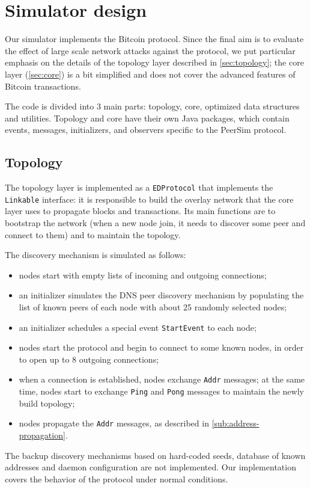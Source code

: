 \section{Simulator design}
Our simulator implements the Bitcoin protocol.
Since the final aim is to evaluate the effect of large scale network attacks against the protocol, we put particular emphasis on the details of the topology layer described in \cref{sec:topology};
the core layer (\cref{sec:core}) is a bit simplified and does not cover the advanced features of Bitcoin transactions.

\smallskip
The code is divided into \num{3} main parts: topology, core, optimized data structures and utilities.
Topology and core have their own Java packages, which contain events, messages, initializers, and observers specific to the PeerSim protocol.

\subsection{Topology}
The topology layer is implemented as a \texttt{EDProtocol} that implements the \texttt{Linkable} interface:
it is responsible to build the overlay network that the core layer uses to propagate blocks and transactions.
Its main functions are to bootstrap the network (when a new node join, it needs to discover some peer and connect to them) and to maintain the topology.

\medskip
\noindent
The discovery mechanism is simulated as follows:
\begin{itemize}
	\item nodes start with empty lists of incoming and outgoing connections;
	\item an initializer simulates the DNS peer discovery mechanism by populating the list of known peers of each node with about \num{25} randomly selected nodes;
	\item an initializer schedules a special event \texttt{StartEvent} to each node;
	\item nodes start the protocol and begin to connect to some known nodes, in order to open up to \num{8} outgoing connections;
	\item when a connection is established, nodes exchange \texttt{Addr} messages; at the same time, nodes start to exchange \texttt{Ping} and \texttt{Pong} messages to maintain the newly build topology;
	\item nodes propagate the \texttt{Addr} messages, as described in \cref{sub:address-propagation}.
\end{itemize}
The backup discovery mechanisms based on hard-coded seeds, database of known addresses and daemon configuration are not implemented.
Our implementation covers the behavior of the protocol under normal conditions.


